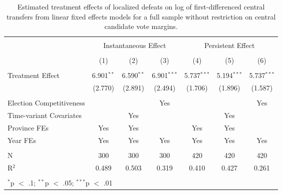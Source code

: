 
\begin{table}[!htbp] \centering 
  \caption{Estimated treatment effects of localized defeats on log of first-differenced central transfers 
          from linear fixed effects models for a full sample without restriction on central candidate vote margins.} 
  \label{tab:lfe_simple} 
\begin{tabular}{@{\extracolsep{5pt}}lcccccc} 
\\[-1.8ex]\hline 
\hline \\[-1.8ex] 
 & \multicolumn{3}{c}{Instantaneous Effect} & \multicolumn{3}{c}{Persistent Effect} \\ 
\\[-1.8ex] & (1) & (2) & (3) & (4) & (5) & (6)\\ 
\hline \\[-1.8ex] 
 Treatment Effect & 6.901$^{**}$ & 6.590$^{**}$ & 6.901$^{***}$ & 5.737$^{***}$ & 5.194$^{***}$ & 5.737$^{***}$ \\ 
  & (2.770) & (2.891) & (2.494) & (1.706) & (1.896) & (1.587) \\ 
 \hline \\[-1.8ex] 
Election Competitiveness &  &  & Yes &  &  & Yes \\ 
Time-variant Covariates &  & Yes &  &  & Yes &  \\ 
Province FEs & Yes & Yes &  & Yes & Yes &  \\ 
Year FEs & Yes & Yes & Yes & Yes & Yes & Yes \\ 
\hline \\[-1.8ex] 
N & 300 & 300 & 300 & 420 & 420 & 420 \\ 
R$^{2}$ & 0.489 & 0.503 & 0.319 & 0.410 & 0.427 & 0.261 \\ 
\hline 
\hline \\[-1.8ex] 
\multicolumn{7}{l}{$^{*}$p $<$ .1; $^{**}$p $<$ .05; $^{***}$p $<$ .01} \\ 
\end{tabular} 
\end{table} 
